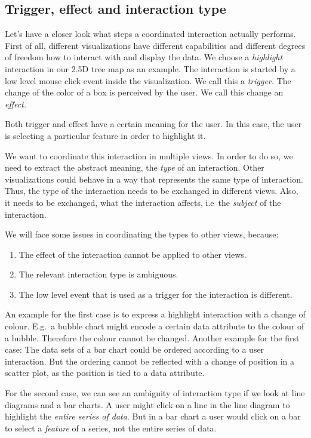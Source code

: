 \documentclass{article}
\newcommand{\tmap}{\textsc{2.5D} tree map}
\begin{document}
\subsection{Trigger, effect and interaction type}

Let's have a closer look what steps a coordinated interaction actually performs.
First of all, different visualizations have different capabilities and different degrees of freedom how to interact with and display the data.
We choose a \emph{highlight} interaction in our \tmap{} as an example.
The interaction is started by a low level mouse click event inside the visualization.
We call this a \emph{trigger.}
The change of the color of a box is perceived by the user.
We call this change an \emph{effect.}

Both trigger and effect have a certain meaning for the user.
In this case, the user is selecting a particular feature in order to highlight it.

We want to coordinate this interaction in multiple views.
In order to do so, we need to extract the abstract meaning, the \emph{type} of an interaction.
Other visualizations could behave in a way that represents the same type of interaction.
Thus, the type of the interaction needs to be exchanged in different views.
Also, it needs to be exchanged, what the interaction affects, i.e\ the \emph{subject} of the interaction.

We will face some issues in coordinating the types to other views, because:
\begin{enumerate}
    \item
        The effect of the interaction cannot be applied to other views.
    \item
        The relevant interaction type is ambiguous.
    \item
        The low level event that is used as a trigger for the interaction is different.
\end{enumerate}
An example for the first case is to express a highlight interaction with a change of colour.
E.g.\ a bubble chart might encode a certain data attribute to the colour of a bubble.
Therefore the colour cannot be changed.
Another example for the first case:
The data sets of a bar chart could be ordered according to a user interaction.
But the ordering cannot be reflected with a change of position in a scatter plot, as the position is tied to a data attribute.

For the second case, we can see an ambiguity of interaction type if we look at line diagrams and a bar charts.
A user might click on a line in the line diagram to highlight the \emph{entire series of data}.
But in a bar chart a user would click on a bar to select a \emph{feature} of a series, not the entire series of data.
\end{document}
